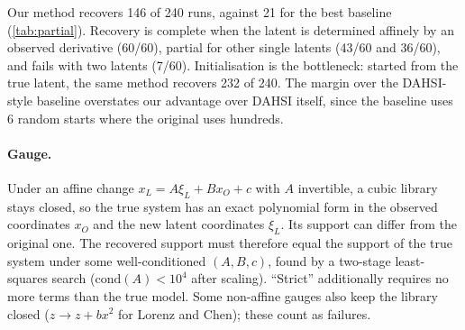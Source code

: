 Our method recovers 146 of 240 runs, against 21 for the best baseline (\cref{tab:partial}). Recovery is complete when the latent is determined affinely by an observed derivative (60/60), partial for other single latents (43/60 and 36/60), and fails with two latents (7/60). Initialisation is the bottleneck: started from the true latent, the same method recovers 232 of 240. The margin over the DAHSI-style baseline overstates our advantage over DAHSI itself, since the baseline uses 6 random starts where the original uses hundreds.


\paragraph{Gauge.} Under an affine change $x_L=A\xi_L+Bx_O+c$ with $A$ invertible, a cubic library stays closed, so the true system has an exact polynomial form in the observed coordinates $x_O$ and the new latent coordinates $\xi_L$. Its support can differ from the original one. The recovered support must therefore equal the support of the true system under some well-conditioned $(A,B,c)$, found by a two-stage least-squares search ($\mathrm{cond}(A)<10^4$ after scaling). ``Strict'' additionally requires no more terms than the true model. Some non-affine gauges also keep the library closed ($z\to z+bx^2$ for Lorenz and Chen); these count as failures.

